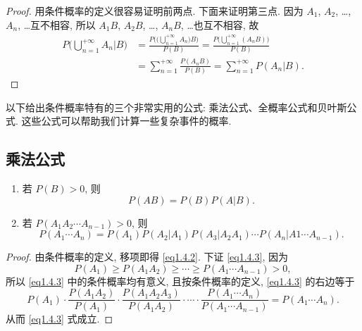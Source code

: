 \begin{proof}
  用条件概率的定义很容易证明前两点.
  下面来证明第三点.
  因为 $A_1$, $A_2$, \dots, $A_n$, \dots 互不相容,
  所以 $A_1B$, $A_2B$, \dots, $A_nB$, \dots 也互不相容,
  故
  \begin{align*}
    P \biggl( \bigcup _{n=1} ^{+\infty} A_n | B \biggr)
    &= \frac{P \Biggl( \biggl( \bigcup _{n=1} ^{+\infty} A_n \biggr) B \Biggr)}{P (B)}
    = \frac{P \biggl( \bigcup _{n=1} ^{+\infty} (  A_n B ) \biggr)}{P (B)}\\
    &= \sum _{n=1} ^{+\infty} \frac{P (A_n B)}{P(B)}
    = \sum _{n=1} ^{+\infty} P (A_n | B).
  \end{align*}
\end{proof}

以下给出条件概率特有的三个非常实用的公式:
乘法公式、全概率公式和贝叶斯公式.
这些公式可以帮助我们计算一些复杂事件的概率.

\subsection{乘法公式}

\begin{property}[乘法公式]
  \begin{enumerate}
    \item 若 $P(B) > 0$,
    则
    \begin{equation}
      P(AB) = P(B) P(A|B).
      \label{eq1.4.2}
    \end{equation}
    \item 若 $P(A_1 A_2 \dotsb A_{n-1}) > 0$,
    则
    \begin{equation}
      P(A_1 \dotsb A_n) = P(A_1) P(A_2 | A_1) P(A_3 | A_2 A_1) \dotsb P(A_n | A1 \dotsb A_{n-1}).
      \label{eq1.4.3}
    \end{equation}
  \end{enumerate}
\end{property}

\begin{proof}
  由条件概率的定义,
  移项即得 \eqref{eq1.4.2}.
  下证 \eqref{eq1.4.3},
  因为
  \[
    P(A_1) \ge P(A_1 A_2) \ge \dotsb \ge P(A_1 \dotsb A_{n-1}) > 0,
  \]
  所以 \eqref{eq1.4.3} 中的条件概率均有意义,
  且按条件概率的定义,
  \eqref{eq1.4.3} 的右边等于
  \[
    P(A_1)
    \cdot \frac{P(A_1 A_2)}{P(A_1)}
    \cdot \frac{P(A_1 A_2 A_3)}{P(A_1 A_2)}
    \cdot \dotsb
    \cdot \frac{P(A_1 \dotsb A_n)}{P(A_1 \dotsb A_{n-1})}
    = P(A_1 \dotsb A_n).
  \]
  从而 \eqref{eq1.4.3} 式成立.
\end{proof}

